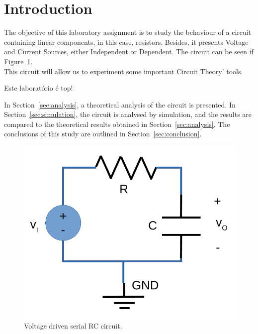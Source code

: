 \section{Introduction}
\label{sec:introduction}

The objective of this laboratory assignment is to study the behaviour of a circuit containing linear components, in this case, resistors. Besides, it presents Voltage and Current Sources, either Independent or Dependent. The circuit can be seen if Figure~\ref{fig:rc}.\\
This circuit will allow us to experiment some important Circuit Theory' tools.

Este laboratório é top!

In Section~\ref{sec:analysis}, a theoretical analysis of the circuit is
presented. In Section~\ref{sec:simulation}, the circuit is analysed by
simulation, and the results are compared to the theoretical results obtained in
Section~\ref{sec:analysis}. The conclusions of this study are outlined in
Section~\ref{sec:conclusion}.

\begin{figure}[h] \centering
\includegraphics[width=0.4\linewidth]{rc.pdf}
\caption{Voltage driven serial RC circuit.}
\label{fig:rc}
\end{figure}

